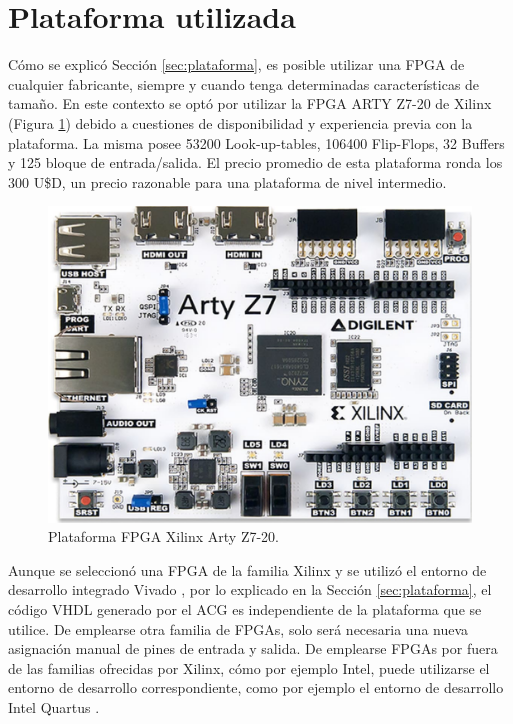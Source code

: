 \section{Plataforma utilizada}
	\label{sec:ARTY}
	
	Cómo se explicó Sección \ref{sec:plataforma}, es posible utilizar una FPGA de cualquier fabricante, siempre y cuando tenga determinadas características de tamaño. En este contexto se optó por utilizar la FPGA ARTY Z7-20 de Xilinx (Figura \ref{fig:FPGA}) debido a cuestiones de disponibilidad y experiencia previa con la plataforma. La misma posee 53200 Look-up-tables, 106400 Flip-Flops, 32 Buffers y 125 bloque de entrada/salida. El precio promedio de esta plataforma ronda los 300 U\$D, un precio razonable para una plataforma de nivel intermedio.	
	
	\begin{figure}[H]
		\centering
		\includegraphics[width=1\textwidth]{Figuras/FPGA}
		\centering\caption{Plataforma FPGA Xilinx Arty Z7-20.}
		\label{fig:FPGA}
	\end{figure}
	
	Aunque se seleccionó una FPGA de la familia Xilinx \cite{Paper_30,Paper_36,Paper_37,Paper_40,Paper_41,Paper_47,Paper_97,Paper_104,Paper_106} y se utilizó el entorno de desarrollo integrado Vivado \cite{VIVADO,Paper_111}, por lo explicado en la Sección \ref{sec:plataforma}, el código VHDL generado por el ACG es independiente de la plataforma que se utilice. De emplearse otra familia de FPGAs, solo será necesaria una nueva asignación manual de pines de entrada y salida. De emplearse FPGAs por fuera de las familias ofrecidas por Xilinx, cómo por ejemplo Intel, puede utilizarse el entorno de desarrollo correspondiente, como por ejemplo el entorno de desarrollo Intel Quartus \cite{QUARTUS}.
	
